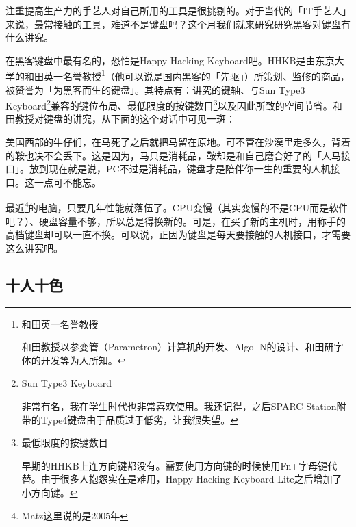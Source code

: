\documentclass[a4paper,12pt]{article}
\begin{document}
注重提高生产力的手艺人对自己所用的工具是很挑剔的。对于当代的「IT手艺人」来说，最常接触的工具，难道不是键盘吗？这个月我们就来研究研究黑客对键盘有什么讲究。

在黑客键盘中最有名的，恐怕是Happy Hacking Keyboard吧。HHKB是由东京大学的和田英一名誉教授\footnote{和田英一名誉教授

和田教授以参变管（Parametron）计算机的开发、Algol N的设计、和田研字体的开发等为人所知。}（他可以说是国内黑客的「先驱」）所策划、监修的商品，被赞誉为「为黑客而生的键盘」。其特点有：讲究的键轴、与Sun Type3 Keyboard\footnote{Sun Type3 Keyboard

非常有名，我在学生时代也非常喜欢使用。我还记得，之后SPARC Station附带的Type4键盘由于品质过于低劣，让我很失望。}兼容的键位布局、最低限度的按键数目\footnote{最低限度的按键数目

早期的HHKB上连方向键都没有。需要使用方向键的时候使用Fn+字母键代替。由于很多人抱怨实在是难用，Happy Hacking Keyboard Lite之后增加了小方向键。}以及因此所致的空间节省。和田教授对键盘的讲究，从下面的这个对话中可见一斑：

美国西部的牛仔们，在马死了之后就把马留在原地。可不管在沙漠里走多久，背着的鞍也决不会丢下。这是因为，马只是消耗品，鞍却是和自己磨合好了的「人马接口」。放到现在就是说，PC不过是消耗品，键盘才是陪伴你一生的重要的人机接口。这一点可不能忘。

最近\footnote{Matz这里说的是2005年}的电脑，只要几年性能就落伍了。CPU变慢（其实变慢的不是CPU而是软件吧？）、硬盘容量不够，所以总是得换新的。可是，在买了新的主机时，用称手的高档键盘却可以一直不换。可以说，正因为键盘是每天要接触的人机接口，才需要这么讲究吧。

\subsection{十人十色}
\end{document}
